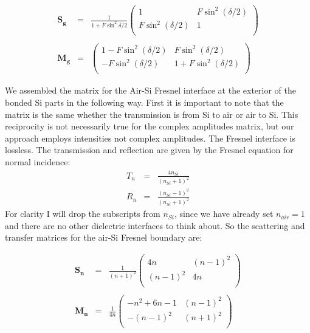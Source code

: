 \documentclass[osajnl,preprint,showpacs,superscriptaddress,12pt]{revtex4-1} %
\begin{document}
\begin{eqnarray}
\boldsymbol{S_g}&=&\frac{1}{1+F\sin^2{\delta/2}} \left(
\begin{array}{cc}
1 & F \sin ^2(\delta/2) \\
F \sin ^2(\delta/2) & 1 \\
\end{array}
\right) \nonumber \\
\nonumber \\
\boldsymbol{M_g}&=&\left(
\begin{array}{cc}
 1-F \sin ^2(\delta/2) & F \sin ^2(\delta/2) \\
 -F \sin ^2(\delta/2) & 1+F \sin ^2(\delta/2) \\
\end{array}
\right)
\label{eqn:EtalonMatrix}
\end{eqnarray}

We assembled the matrix for the Air-Si Fresnel interface at the exterior of the bonded Si parts in the following way.  First it is important to note that the matrix is the same whether the transmission is from Si to air or air to Si.  This reciprocity is not necessarily true for the complex amplitudes matrix, but our approach employs intensities not complex amplitudes.  The Fresnel interface is lossless.  The transmission and reflection are given by the Fresnel equation for normal incidence:
\begin{eqnarray}
T_n&=&\frac{4n_{Si}}{(n_{Si}+1)^2} \\
R_n&=&\frac{(n_{Si}-1)^2}{(n_{Si}+1)^2} \label{eq:FresnelTrans}
\end{eqnarray}
For clarity I will drop the subscripts from $n_{Si}$, since we have already set $n_{air}=1$ and there are no other dielectric interfaces to think about.  So the scattering and transfer matrices for the air-Si Fresnel boundary are:

\begin{eqnarray}
\boldsymbol{S_n}&=&\frac{1}{(n+1)^2} \left(
\begin{array}{cc}
4n & (n-1)^2 \\
(n-1)^2 & 4n \\
\end{array}
\right)  \nonumber \\
\nonumber \\
\boldsymbol{M_n}&=&\frac{1}{4n}\left(
\begin{array}{cc}
 -n^2+6  n-1 & ( n-1)^2 \\
 -( n-1)^2 & ( n+1)^2 \\
\end{array}
\right)
\label{eqn:SiAirMatrix}
\end{eqnarray}
\end{document}

